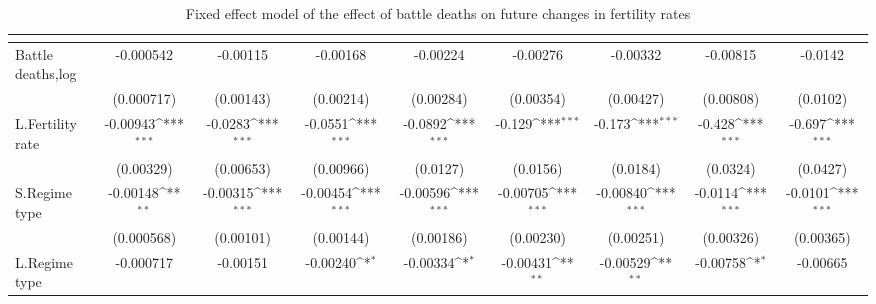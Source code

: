 \begin{table}[htbp]\centering
\def\sym#1{\ifmmode^{#1}\else\(^{#1}\)\fi}
\caption{Fixed effect model of the effect of battle deaths on future changes in fertility rates \label{fertilitybdeath}}
\begin{tabular}{l*{8}{c}}
\hline\hline
                    &&&&&&&&\\
\hline
Battle deaths,log   &   -0.000542         &    -0.00115         &    -0.00168         &    -0.00224         &    -0.00276         &    -0.00332         &    -0.00815         &     -0.0142         \\
                    &  (0.000717)         &   (0.00143)         &   (0.00214)         &   (0.00284)         &   (0.00354)         &   (0.00427)         &   (0.00808)         &    (0.0102)         \\
[1em]
L.Fertility rate    &    -0.00943\sym{***}&     -0.0283\sym{***}&     -0.0551\sym{***}&     -0.0892\sym{***}&      -0.129\sym{***}&      -0.173\sym{***}&      -0.428\sym{***}&      -0.697\sym{***}\\
                    &   (0.00329)         &   (0.00653)         &   (0.00966)         &    (0.0127)         &    (0.0156)         &    (0.0184)         &    (0.0324)         &    (0.0427)         \\
[1em]
S.Regime type       &    -0.00148\sym{**} &    -0.00315\sym{***}&    -0.00454\sym{***}&    -0.00596\sym{***}&    -0.00705\sym{***}&    -0.00840\sym{***}&     -0.0114\sym{***}&     -0.0101\sym{***}\\
                    &  (0.000568)         &   (0.00101)         &   (0.00144)         &   (0.00186)         &   (0.00230)         &   (0.00251)         &   (0.00326)         &   (0.00365)         \\
[1em]
L.Regime type       &   -0.000717         &    -0.00151         &    -0.00240\sym{*}  &    -0.00334\sym{*}  &    -0.00431\sym{**} &    -0.00529\sym{**} &    -0.00758\sym{*}  &    -0.00665         \\

\end{tabular}
\end{table}
